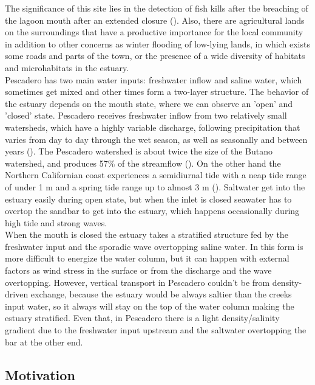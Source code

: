 \documentclass[11pt,letterpaper]{article}
\begin{document}
The significance of this site lies in the detection of fish kills after the breaching of the lagoon mouth after an extended closure (\cite{largier2015}). Also, there are agricultural lands on the surroundings that have a productive importance for the local community in addition to other concerns as winter flooding of low-lying lands, in which exists some roads and parts of the town, or the presence of a wide diversity of habitats and microhabitats in the estuary.\\

Pescadero has two main water inputs: freshwater inflow and saline water, which sometimes get mixed and other times form a two-layer structure. The behavior of the estuary depends on the mouth state, where we can observe an 'open' and 'closed' state. Pescadero receives freshwater inflow from two relatively small watersheds, which have a highly variable discharge, following precipitation that varies from day to day through the wet season, as well as seasonally and between years (\cite{largier2015}). The Pescadero watershed is about twice the size of the Butano watershed, and produces 57\% of the streamflow (\cite{Williams2014}). On the other hand the Northern Californian coast experiences a semidiurnal tide with a neap tide range of under 1 m and a spring tide range up to almost 3 m (\cite{Williams2014}). Saltwater get into the estuary easily during open state, but when the inlet is closed seawater has to overtop the sandbar to get into the estuary, which happens occasionally during high tide and strong waves.\\

When the mouth is closed the estuary takes a stratified structure fed by the freshwater input and the sporadic wave overtopping saline water. In this form is more difficult to energize the water column, but it can happen with external factors as wind stress in the surface or from the discharge and the wave overtopping. However, vertical transport in Pescadero couldn't be from density-driven exchange, because the estuary would be always saltier than the creeks input water, so it always will stay on the top of the water column making the estuary stratified. Even that, in Pescadero there is a light density/salinity gradient due to the freshwater input upstream and the saltwater overtopping the bar at the other end.\\

\subsection{Motivation}
\end{document}
